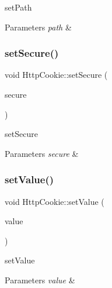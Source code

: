 set\+Path 


\begin{DoxyParams}{Parameters}
{\em path} & \\
\hline
\end{DoxyParams}
\mbox{\label{class_http_cookie_ab96aa1b1dd995c05fc0e092e1fb7b1e3}} 
\subsubsection{\texorpdfstring{set\+Secure()}{setSecure()}}
{\footnotesize\ttfamily void Http\+Cookie\+::set\+Secure (\begin{DoxyParamCaption}\item[{bool}]{secure }\end{DoxyParamCaption})}



set\+Secure 


\begin{DoxyParams}{Parameters}
{\em secure} & \\
\hline
\end{DoxyParams}
\mbox{\label{class_http_cookie_a2f38c00473e7628a708eae2dd0cd51f0}} 
\subsubsection{\texorpdfstring{set\+Value()}{setValue()}}
{\footnotesize\ttfamily void Http\+Cookie\+::set\+Value (\begin{DoxyParamCaption}\item[{const Q\+Byte\+Array \&}]{value }\end{DoxyParamCaption})}



set\+Value 


\begin{DoxyParams}{Parameters}
{\em value} & \\
\hline
\end{DoxyParams}
\mbox{\label{class_http_cookie_a3f086e32413e23fdab53ffefa70b8b0e}} 
